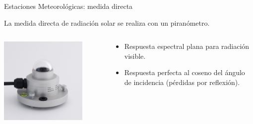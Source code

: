 \documentclass[xcolor={usenames,svgnames,dvipsnames}]{beamer}
\begin{document}
\begin{frame}[label={sec:org29fbc3a}]{Estaciones Meteorológicas: medida directa}
\begin{block}{La medida directa de radiación solar se realiza con un piranómetro.}
\end{block}
\begin{columns}
\begin{column}{0.4\columnwidth}
\begin{center}
\begin{center}
\includegraphics[width=0.8\textwidth]{../figs/piranometro.jpg}
\end{center}
\end{center}
\end{column}
\begin{column}{0.6\columnwidth}
\begin{itemize}
\item Respuesta espectral plana para radiación visible.
\item Respuesta perfecta al coseno del ángulo de incidencia (pérdidas por reflexión).
\end{itemize}
\end{column}
\end{columns}
\end{frame}
\end{document}
